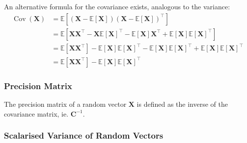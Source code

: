 \documentclass[11pt]{report} %
\begin{document}
An alternative formula for the covariance exists, analogous to the variance:
\begin{align}
\operatorname{Cov}\left(\mathbf{X}\right) &= \mathbb{E}\left[\left(\mathbf{X} - \mathbb{E}\left[\mathbf{X}\right]\right)\left(\mathbf{X} - \mathbb{E}\left[\mathbf{X}\right]\right)^{\top}\right] \\
&= \mathbb{E}\left[\mathbf{X}\mathbf{X}^{\top} - \mathbf{X}\mathbb{E}\left[\mathbf{X}\right]^{\top} - \mathbb{E}\left[\mathbf{X}\right]\mathbf{X}^{\top} + \mathbb{E}\left[\mathbf{X}\right]\mathbb{E}\left[\mathbf{X}\right]^{\top}\right] \\
&= \mathbb{E}\left[\mathbf{X}\mathbf{X}^{\top}\right] - \mathbb{E}\left[\mathbf{X}\right]\mathbb{E}\left[\mathbf{X}\right]^{\top} - \mathbb{E}\left[\mathbf{X}\right]\mathbb{E}\left[\mathbf{X}\right]^{\top} + \mathbb{E}\left[\mathbf{X}\right]\mathbb{E}\left[\mathbf{X}\right]^{\top} \\
&= \mathbb{E}\left[\mathbf{X}\mathbf{X}^{\top}\right] - \mathbb{E}\left[\mathbf{X}\right]\mathbb{E}\left[\mathbf{X}\right]^{\top}
\end{align}

\subsubsection{Precision Matrix}

The precision matrix of a random vector $\mathbf{X}$ is defined as the inverse of the covariance matrix, ie. $\mathbf{C}^{-1}$.

\subsubsection{Scalarised Variance of Random Vectors}
\end{document}
